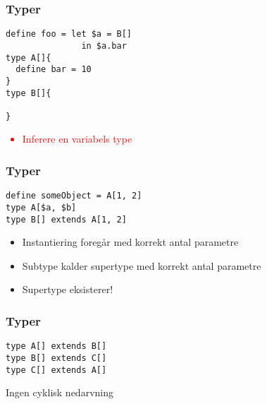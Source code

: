 \begin{frame}[fragile]
\frametitle{Typer}
\begin{lstlisting}
define foo = let $a = B[]
               in $a.bar
type A[]{
  define bar = 10
}
type B[]{

}
\end{lstlisting}
\begin{center}
\textcolor{red}{
\begin{itemize}                                  
\item Inferere en variabels type
\end{itemize}
}
\end{center}
\end{frame}

\begin{frame}[fragile]
\frametitle{Typer}
\begin{lstlisting}
define someObject = A[1, 2]
type A[$a, $b]
type B[] extends A[1, 2]
\end{lstlisting}
\begin{center}
\begin{itemize}                                  
\item Instantiering foregår med korrekt antal parametre
\item Subtype kalder supertype med korrekt antal parametre
\item Supertype eksisterer!
\end{itemize}
\end{center}
\end{frame}

\begin{frame}[fragile]
\frametitle{Typer}
\begin{lstlisting}
type A[] extends B[]
type B[] extends C[]
type C[] extends A[]
\end{lstlisting}

\begin{center}                                 
\item Ingen cyklisk nedarvning
\end{center}
\end{frame}

\begin{frame}[fragile]
\begin{figure}[ht]
  \begin{center}
  \end{center}
  \label{fig:topological}
\end{figure}
\end{frame}

